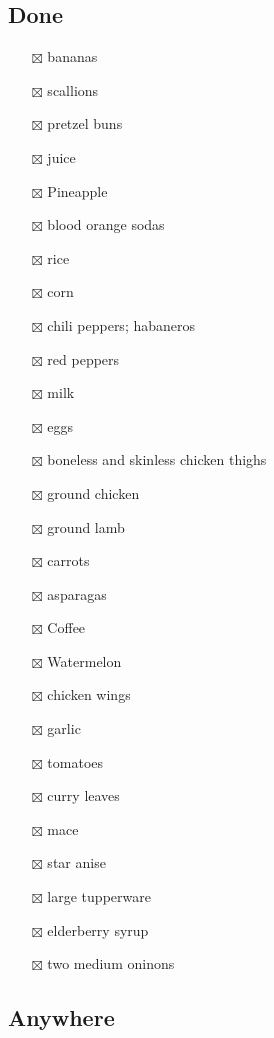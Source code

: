 \documentclass[
]{article}
\providecommand{\tightlist}{%
  \setlength{\itemsep}{0pt}\setlength{\parskip}{0pt}}
\begin{document}
\hypertarget{done}{%
\subsection{Done}\label{done}}

\begin{itemize}
\tightlist
\item[$\boxtimes$]
  bananas
\item[$\boxtimes$]
  scallions
\item[$\boxtimes$]
  pretzel buns
\item[$\boxtimes$]
  juice
\item[$\boxtimes$]
  Pineapple
\item[$\boxtimes$]
  blood orange sodas
\item[$\boxtimes$]
  rice
\item[$\boxtimes$]
  corn
\item[$\boxtimes$]
  chili peppers; habaneros
\item[$\boxtimes$]
  red peppers
\item[$\boxtimes$]
  milk
\item[$\boxtimes$]
  eggs
\item[$\boxtimes$]
  boneless and skinless chicken thighs
\item[$\boxtimes$]
  ground chicken
\item[$\boxtimes$]
  ground lamb
\item[$\boxtimes$]
  carrots
\item[$\boxtimes$]
  asparagas
\item[$\boxtimes$]
  Coffee
\item[$\boxtimes$]
  Watermelon
\item[$\boxtimes$]
  chicken wings
\item[$\boxtimes$]
  garlic
\item[$\boxtimes$]
  tomatoes
\item[$\boxtimes$]
  curry leaves
\item[$\boxtimes$]
  mace
\item[$\boxtimes$]
  star anise
\item[$\boxtimes$]
  large tupperware
\item[$\boxtimes$]
  elderberry syrup
\item[$\boxtimes$]
  two medium oninons
\end{itemize}

\hypertarget{anywhere}{%
\subsection{Anywhere}\label{anywhere}}
\end{document}
